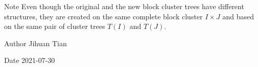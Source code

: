 \begin{DoxyDescription}
\item[Note ]Even though the original and the new block cluster trees have different structures, they are created on the same complete block cluster $I \times J$ and based on the same pair of cluster trees $T(I)$ and $T(J)$. 
\end{DoxyDescription}

\begin{DoxyAuthor}{Author}
Jihuan Tian 
\end{DoxyAuthor}
\begin{DoxyDate}{Date}
2021-\/07-\/30 
\end{DoxyDate}
